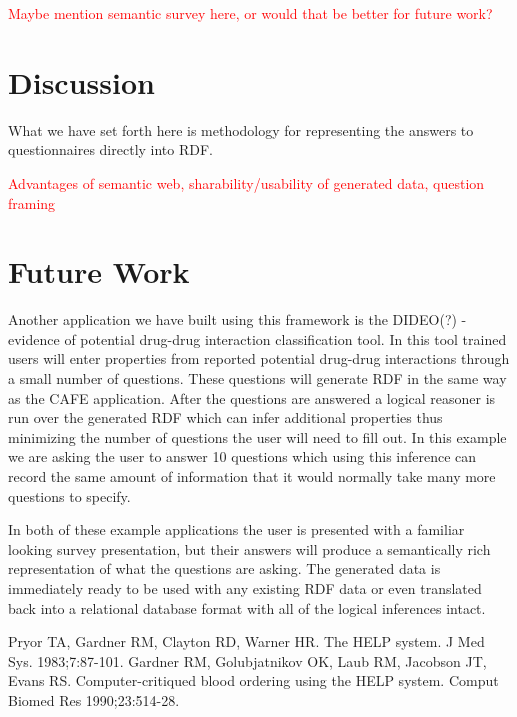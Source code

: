 \documentclass{amia}
\begin{document}
\textcolor{red}{Maybe mention semantic survey here, or would that be better for future work?}

\section*{Discussion}
What we have set forth here is methodology for representing the answers to questionnaires directly into RDF.

\textcolor{red}{Advantages of semantic web, sharability/usability of generated data, question framing}

\section*{Future Work}
Another application we have built using this framework is the DIDEO(?) - evidence of potential drug-drug interaction classification tool.
In this tool trained users will enter properties from reported potential drug-drug interactions through a small number of questions.
These questions will generate RDF in the same way as the CAFE application.
After the questions are answered a logical reasoner is run over the generated RDF which can infer additional properties thus minimizing the number of questions the user will need to fill out.
In this example we are asking the user to answer 10 questions which using this inference can record the same amount of information that it would normally take many more questions to specify.

In both of these example applications the user is presented with a familiar looking survey presentation, but their answers will produce a semantically rich representation of what the questions are asking.  The generated data is immediately ready to be used with any existing RDF data or even translated back into a relational database format with all of the logical inferences intact.


\makeatletter
\renewcommand{\@biblabel}[1]{\hfill #1.}
\makeatother


\begin{thebibliography}{1}
\setlength\itemsep{-0.1em}

Pryor TA, Gardner RM, Clayton RD, Warner HR. The HELP system. J Med Sys. 1983;7:87-101.
Gardner RM, Golubjatnikov OK, Laub RM, Jacobson JT, Evans RS. Computer-critiqued blood ordering using the HELP system. Comput Biomed Res 1990;23:514-28.

\end{thebibliography}
\end{document}

